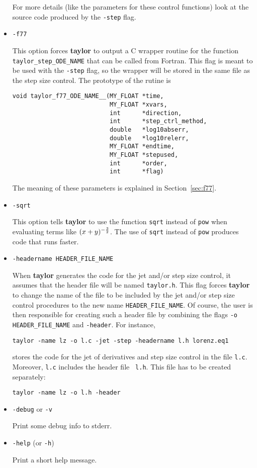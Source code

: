 \documentclass{article}
\begin{document}
\begin{itemize}
{For more details (like the parameters for these control functions)
look at the source code produced by the {\tt -step} flag.
}

\item{\verb+-f77+

This option forces {\bf taylor} to output a C wrapper 
routine for the function
\verb+taylor_step_ODE_NAME+ that can
be called from Fortran. This flag is meant to be
used with the {\tt -step} flag, so the wrapper
will be stored in the same file as the step size
control. The prototype of the rutine is
\begin{verbatim}
void taylor_f77_ODE_NAME__(MY_FLOAT *time,
                           MY_FLOAT *xvars,
                           int      *direction,
                           int      *step_ctrl_method,
                           double   *log10abserr,
                           double   *log10relerr,
                           MY_FLOAT *endtime,
                           MY_FLOAT *stepused,
                           int      *order,
                           int      *flag)
\end{verbatim}
The meaning of these parameters is explained in
Section~\ref{sec:f77}.}

\item{\verb+-sqrt+

This option tells {\bf taylor} to use the
function \verb+sqrt+ instead of \verb+pow+
when evaluating terms like $(x+y)^{-{3\over 2}}$.
The use of {\tt sqrt} instead of {\tt pow} produces
code that runs faster.}

\item{\verb+-headername HEADER_FILE_NAME+

When {\bf taylor} generates the code for the jet and/or step size
control, it assumes that the header file will be named {\tt taylor.h}.
This flag forces {\bf taylor} to change the name of the file to be
included by the jet and/or step size control procedures to the new
name {\tt HEADER\_FILE\_NAME}. Of course, the user is then
responsible for creating such a header file by combining the flags
{\tt -o HEADER\_FILE\_NAME} and {\tt -header}. For instance,
\begin{verbatim}
taylor -name lz -o l.c -jet -step -headername l.h lorenz.eq1
\end{verbatim}
stores the code for the jet of derivatives and step size control in
the file {\tt l.c}. Moreover, {\tt l.c} includes the header file {\tt
l.h}. This file has to be created separately:
\begin{verbatim}
taylor -name lz -o l.h -header
\end{verbatim}
}

\item{\verb+-debug+ or \verb+-v+ 

Print some debug info to stderr.}

\item{\verb+-help+ (or \verb+-h+)

Print a short help
message.}

\end{itemize}
\end{document}
